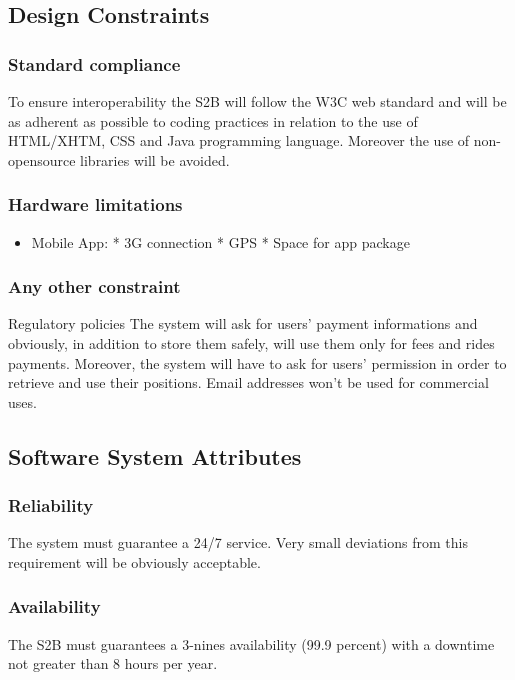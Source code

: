 \subsection{Design Constraints}
	\subsubsection{Standard compliance}
	To ensure interoperability the S2B will follow the W3C web standard and will be as adherent as possible to  coding practices in relation to the use of HTML/XHTM, CSS and Java programming language. Moreover the use of non-opensource libraries will be avoided.
	\subsubsection{Hardware limitations}
		\begin{itemize}
		\item Mobile App: \newline
		* 3G connection\newline
		* GPS\newline
		* Space for app package
		\end{itemize}
	
	\subsubsection{Any other constraint}
	Regulatory policies
	The system will ask for users' payment informations and obviously, in addition to store them
	safely, will use them only for fees and rides payments.
	Moreover, the system will have to ask for users' permission in order to retrieve and use their
	positions.
	Email addresses won't be used for commercial uses.
\subsection{Software System Attributes} 
	\subsubsection{Reliability}
	The system must guarantee a 24/7 service. Very small deviations from this requirement will be
	obviously acceptable.
	\subsubsection{Availability}
	The S2B must guarantees a 3-nines availability (99.9 percent) with a downtime not greater than 8 hours per year.

